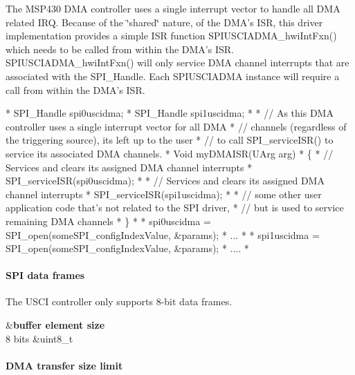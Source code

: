 The M\-S\-P430 D\-M\-A controller uses a single interrupt vector to handle all D\-M\-A related I\-R\-Q. Because of the \char`\"{}shared\char`\"{} nature, of the D\-M\-A's I\-S\-R, this driver implementation provides a simple I\-S\-R function S\-P\-I\-U\-S\-C\-I\-A\-D\-M\-A\-\_\-hwi\-Int\-Fxn() which needs to be called from within the D\-M\-A's I\-S\-R. S\-P\-I\-U\-S\-C\-I\-A\-D\-M\-A\-\_\-hwi\-Int\-Fxn() will only service D\-M\-A channel interrupts that are associated with the S\-P\-I\-\_\-\-Handle. Each S\-P\-I\-U\-S\-C\-I\-A\-D\-M\-A instance will require a call from within the D\-M\-A's I\-S\-R.


\begin{DoxyCode}
*  SPI_Handle spi0uscidma;
*  SPI_Handle spi1uscidma;
*
*  \textcolor{comment}{// As this DMA controller uses a single interrupt vector for all DMA}
*  \textcolor{comment}{// channels (regardless of the triggering source), its left up to the user}
*  \textcolor{comment}{// to call SPI\_serviceISR() to service its associated DMA channels.}
*  Void myDMAISR(UArg arg)
*  \{
*      \textcolor{comment}{// Services and clears its assigned DMA channel interrupts}
*      SPI_serviceISR(spi0uscidma);
*
*      \textcolor{comment}{// Services and clears its assigned DMA channel interrupts}
*      SPI_serviceISR(spi1uscidma);
*
*      \textcolor{comment}{// some other user application code that's not related to the SPI driver,}
*      \textcolor{comment}{// but is used to service remaining DMA channels}
*  \}
*
*  spi0uscidma = SPI_open(someSPI\_configIndexValue, &params);
*  ...
*
*  spi1uscidma = SPI_open(someSPI\_configIndexValue, &params);
*  ....
*  
\end{DoxyCode}


\paragraph*{S\-P\-I data frames}

The U\-S\-C\-I controller only supports 8-\/bit data frames.

\begin{TabularC}{2}
\hline
{}&{\bf buffer element size  }\\
8 bits &uint8\-\_\-t \\
\end{TabularC}
\paragraph*{D\-M\-A transfer size limit}

